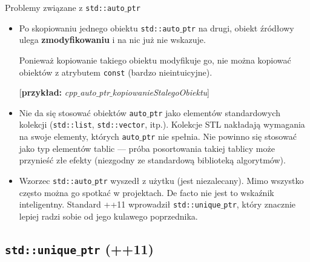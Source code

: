\begin{frame}{Problemy związane z \texttt{std::auto$\_$ptr}}
  \begin{itemize}
  \small
  \item Po skopiowaniu jednego obiektu \texttt{std::auto$\_$ptr} na drugi,
    obiekt źródłowy ulega \textbf{zmodyfikowaniu} i na nic już nie wskazuje.

    Ponieważ kopiowanie takiego obiektu modyfikuje go, 
    nie można kopiować obiektów z atrybutem \texttt{const}
    (bardzo nieintuicyjne).
    
    [\textbf{przykład:} 
    \textit{cpp$\_$auto$\_$ptr$\_$kopiowanieStalegoObiektu}]
    
    \pause
    
    
          \item Nie da się stosować obiektów \texttt{auto$\_$ptr} jako elementów standardowych kolekcji (\texttt{std::list}, \texttt{std::vector}, itp.). Kolekcje STL nakładają wymagania na swoje elementy, których \texttt{auto$\_$ptr}
          nie spełnia.
      Nie powinno się stosować jako typ elementów tablic --- próba posortowania 
      takiej tablicy może przynieść złe efekty (niezgodny ze standardową biblioteką algorytmów). \pause
      
      \item Wzorzec \texttt{std::auto$\_$ptr} wyszedł z użytku (jest niezalecany). Mimo wszystko często można go spotkać w projektach. De facto
      nie jest to wskaźnik inteligentny. Standard \C++11 wprowadził \texttt{std::unique$\_$ptr}, który znacznie lepiej radzi sobie od jego kulawego poprzednika.
  \end{itemize}
\end{frame}

\subsection{\texttt{std::unique$\_$ptr} \tiny{(\C++11)}}

